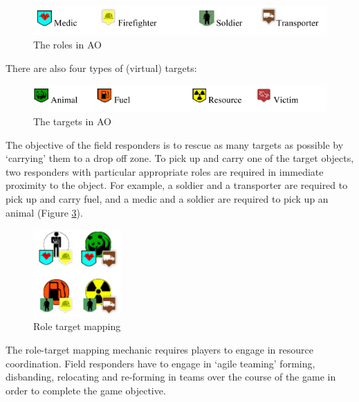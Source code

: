 \begin{figure}[h]
  \centering
  \includegraphics[width=1\textwidth]{img/approach/AOroles}
  \caption{The roles in \ac{AO}}
  \label{fig:AOroles}
\end{figure}

There are also four types of (virtual) targets:\\

\begin{figure}[h]
  \centering
  \includegraphics[width=1\textwidth]{img/approach/AOtargets}
  \caption{The targets in \ac{AO}}
  \label{fig:AOtargets}
\end{figure}

The objective of the field responders is to rescue as many targets as possible by `carrying' them to a drop off zone. To pick up and carry one of the target objects, two responders with particular appropriate roles are required in immediate proximity to the object. For example, a soldier and a transporter are required to pick up and carry fuel, and a medic and a soldier are required to pick up an animal (Figure \ref{fig:roleTargetMapping}).\\

\begin{figure}[h]
  \centering
  \includegraphics[width=0.3\textwidth]{img/approach/roleTargetMapping}
  \caption{Role target mapping}
  \label{fig:roleTargetMapping}
\end{figure}

The role-target mapping mechanic requires players to engage in resource coordination. Field responders have to engage in `agile teaming' forming, disbanding, relocating and re-forming in teams over the course of the game in order to complete the game objective. \\

